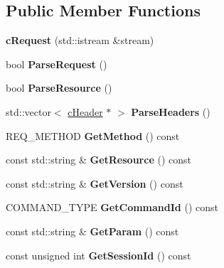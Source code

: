 \subsection*{\-Public \-Member \-Functions}
\begin{DoxyCompactItemize}
\item 
\hypertarget{classhttp__server_1_1cRequest_aa3cadbdda5c1ad42a29f182bddc94fb1}{
{\bfseries c\-Request} (std\-::istream \&stream)}
\label{classhttp__server_1_1cRequest_aa3cadbdda5c1ad42a29f182bddc94fb1}

\item 
\hypertarget{classhttp__server_1_1cRequest_ac9531a813f05222ee24c7a27d2ec90fd}{
bool {\bfseries \-Parse\-Request} ()}
\label{classhttp__server_1_1cRequest_ac9531a813f05222ee24c7a27d2ec90fd}

\item 
\hypertarget{classhttp__server_1_1cRequest_ab623c396e4dbde0253c99c0a609f275f}{
bool {\bfseries \-Parse\-Resource} ()}
\label{classhttp__server_1_1cRequest_ab623c396e4dbde0253c99c0a609f275f}

\item 
\hypertarget{classhttp__server_1_1cRequest_a4526de1f0c6af63f325b540fa763330b}{
std\-::vector$<$ \hyperlink{classhttp__server_1_1cHeader}{c\-Header} $\ast$ $>$ {\bfseries \-Parse\-Headers} ()}
\label{classhttp__server_1_1cRequest_a4526de1f0c6af63f325b540fa763330b}

\item 
\hypertarget{classhttp__server_1_1cRequest_af0c3d838c88fef758115eda75cd66835}{
\-R\-E\-Q\-\_\-\-M\-E\-T\-H\-O\-D {\bfseries \-Get\-Method} () const }
\label{classhttp__server_1_1cRequest_af0c3d838c88fef758115eda75cd66835}

\item 
\hypertarget{classhttp__server_1_1cRequest_a808d2f736c751db6d111d2cbb2458470}{
const std\-::string \& {\bfseries \-Get\-Resource} () const }
\label{classhttp__server_1_1cRequest_a808d2f736c751db6d111d2cbb2458470}

\item 
\hypertarget{classhttp__server_1_1cRequest_a9f1fbe83f22a917f75085326b96a5577}{
const std\-::string \& {\bfseries \-Get\-Version} () const }
\label{classhttp__server_1_1cRequest_a9f1fbe83f22a917f75085326b96a5577}

\item 
\hypertarget{classhttp__server_1_1cRequest_a51ccd6f85abf1eb131bd3e2c10ad2f59}{
\-C\-O\-M\-M\-A\-N\-D\-\_\-\-T\-Y\-P\-E {\bfseries \-Get\-Command\-Id} () const }
\label{classhttp__server_1_1cRequest_a51ccd6f85abf1eb131bd3e2c10ad2f59}

\item 
\hypertarget{classhttp__server_1_1cRequest_a386946841d675edc9dbf5fd81d8de046}{
const std\-::string \& {\bfseries \-Get\-Param} () const }
\label{classhttp__server_1_1cRequest_a386946841d675edc9dbf5fd81d8de046}

\item 
\hypertarget{classhttp__server_1_1cRequest_ada8f38975ca9bb05bfe9b5b34aa985a5}{
const unsigned int {\bfseries \-Get\-Session\-Id} () const }
\label{classhttp__server_1_1cRequest_ada8f38975ca9bb05bfe9b5b34aa985a5}

\end{DoxyCompactItemize}
